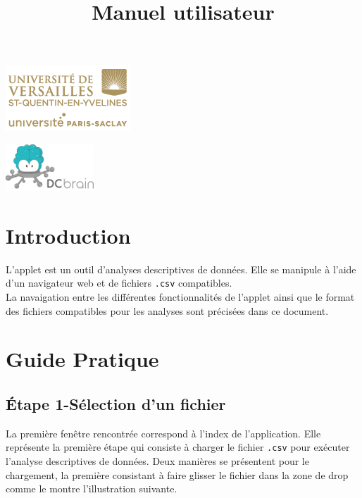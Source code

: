 

\title{\vspace{\fill}\textbf{\Huge Manuel utilisateur}}


\clearpage
\maketitle\vspace{9em}
\begin{center}\includegraphics[scale=0.7]{../Cahier/logo.png}\end{center}
\begin{center}\includegraphics[scale=3]{dcbrain.png}\end{center}
\newpage
\tableofcontents
\newpage\clearpage{}

\section{Introduction}
	L'applet est un outil d'analyses descriptives de données. Elle se manipule à l'aide d'un navigateur web et de fichiers \lstinline!.csv! compatibles.\\
	La navaigation entre les différentes fonctionnalités de l'applet ainsi que le format des fichiers compatibles pour les analyses sont précisées dans ce document.
	
\section{Guide Pratique}
	\subsection{Étape 1-Sélection d'un fichier}
		La première fenêtre rencontrée correspond à l'index de l'application. Elle représente la première étape qui consiste à charger le fichier \lstinline!.csv! pour exécuter l'analyse descriptives de données. 
		Deux manières se présentent pour le chargement, la première consistant à faire glisser le fichier dans la zone de drop comme le montre l'illustration suivante. \\
		
